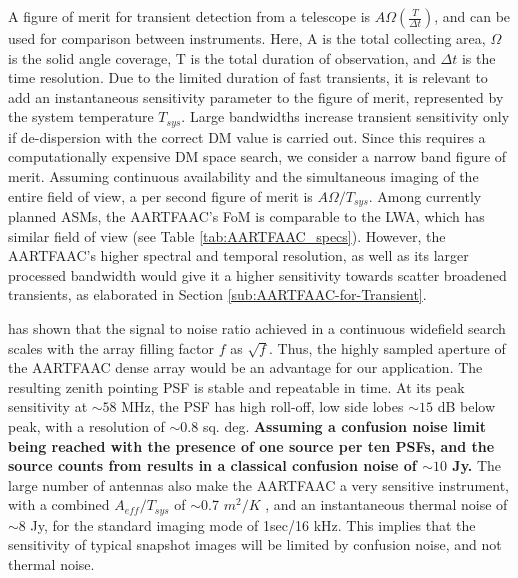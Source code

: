\documentclass{aa}
\begin{document}
A  figure of  merit  for transient  detection  \citep{cordes2004dynamic} from  a
telescope  is  $A\Omega\left(\frac{T}{\Delta t}\right)$,  and  can  be used  for
comparison between instruments.  Here, A  is the total collecting area, $\Omega$
is the solid angle coverage, T is the total duration of observation, and $\Delta
t$ is the time resolution. Due to the limited duration of fast transients, it is
relevant to add  an instantaneous sensitivity parameter to  the figure of merit,
represented  by the  system  temperature $T_{sys}$.   Large bandwidths  increase
transient sensitivity only if de-dispersion with the correct DM value is carried
out.  Since  this requires  a  computationally  expensive  DM space  search,  we
consider a narrow band figure of merit. Assuming continuous availability and the
simultaneous imaging of  the entire field of view, a per  second figure of merit
is  $A\Omega/T_{sys}$.  Among  currently  planned ASMs,  the  AARTFAAC's FoM  is
comparable  to   the  LWA,   which  has  similar   field  of  view   (see  Table
\ref{tab:AARTFAAC_specs}). However, the  AARTFAAC's higher spectral and temporal
resolution, as  well as its  larger processed bandwidth  would give it  a higher
sensitivity  towards  scatter broadened  transients,  as  elaborated in  Section
\ref{sub:AARTFAAC-for-Transient}.

\citet{backer1999pers} has  shown that the signal  to noise ratio  achieved in a
continuous  widefield  search  scales  with  the array  filling  factor  $f$  as
$\sqrt{f}$. Thus, the highly sampled  aperture of the AARTFAAC dense array would
be an advantage for our application. The resulting zenith pointing PSF is stable
and repeatable in  time. At its peak sensitivity at $\sim$$58$  MHz, the PSF has
high roll-off,  low side lobes  $\sim$$15$ dB below  peak, with a  resolution of
$\sim$$0.8$ sq.   deg.  \textbf{Assuming a  confusion noise limit  being reached
  with  the presence of  one source  per ten  PSFs, and  the source  counts from
  \citet{bregman2012system} results in a classical confusion noise of $\sim$$10$
  Jy.}  The  large number of  antennas also make  the AARTFAAC a  very sensitive
instrument,   with   a  combined   $A_{eff}/T_{sys}$   of  $\sim$0.7   $m^{2}/K$
\citep{wijnholds2011situ}, and an instantaneous thermal noise of $\sim$8 Jy, for
the standard imaging mode of 1sec/16  kHz.  This implies that the sensitivity of
typical  snapshot images will  be limited  by confusion  noise, and  not thermal
noise.
\end{document}
